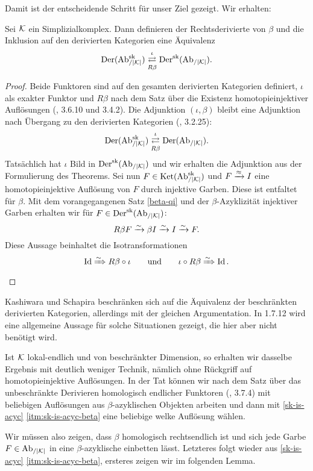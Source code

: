 Damit ist der entscheidende Schritt für unser Ziel gezeigt. Wir
erhalten:
\begin{theorem} \label{dersk-eq}
  Sei $\mathcal{K}$ ein Simplizialkomplex. Dann definieren der Rechtsderivierte
  von $\beta$ und die Inklusion auf den derivierten Kategorien eine
  Äquivalenz
  \[ \operatorname{Der}(\operatorname{Ab}_{/|\mathcal{K}|}^{\operatorname{sk}})
  \mathrel{\mathop{\rightleftarrows}^{\iota}_{R \beta}}
  \operatorname{Der}^{\operatorname{sk}}(\operatorname{Ab}_{/|\mathcal{K}|}). \]
\end{theorem}
\begin{proof}
  Beide Funktoren sind auf den gesamten derivierten Kategorien
  definiert, $\iota$ als exakter Funktor und $R\beta$ nach dem Satz
  über die Existenz homotopieinjektiver Auflösungen (\cite{TD}, 3.6.10
  und 3.4.2). Die Adjunktion $(\iota, \beta)$ bleibt eine Adjunktion
  nach Übergang zu den derivierten Kategorien (\cite{TD}, 3.2.25):
  \[ \operatorname{Der}(\operatorname{Ab}_{/|\mathcal{K}|}^{\operatorname{sk}})
  \mathrel{\mathop{\rightleftarrows}^{\iota}_{R \beta}}
  \operatorname{Der}(\operatorname{Ab}_{/|\mathcal{K}|}).
  \]
  Tatsächlich hat $\iota$ Bild in $\operatorname{Der}^{\operatorname{sk}}(\operatorname{Ab}_{/|\mathcal{K}|})$ und wir erhalten die
  Adjunktion aus der Formulierung des Theorems. Sei nun $F \in
  \operatorname{Ket}(\operatorname{Ab}_{/|\mathcal{K}|}^{\operatorname{sk}})$ und $F \xrightarrow{\approx} I$ eine homotopieinjektive Auflösung von
  $F$ durch injektive Garben. Diese ist entfaltet für $\beta$. Mit dem
  vorangegangenen Satz \ref{beta-qi} und der $\beta$-Azyklizität
  injektiver Garben erhalten wir für $F \in \operatorname{Der}^{\operatorname{sk}}(\operatorname{Ab}_{/|\mathcal{K}|})$:
  \[R \beta F \xrightarrow[]{\sim} \beta I \xrightarrow[]{\sim} I \xrightarrow[]{\sim} F. \]
  Diese Aussage beinhaltet die Isotransformationen
  \[ \operatorname{Id} \xRightarrow{\sim} R \beta \circ \iota
  \qquad \text{und} \qquad
  \iota \circ R \beta \xRightarrow{\sim} \operatorname{Id} .
  \]
\end{proof}
\begin{bem}
  Kashiwara und Schapira beschränken sich auf die Äquivalenz der
  beschränkten derivierten Kategorien, allerdings mit der gleichen
  Argumentation. In \cite{KS} 1.7.12 wird eine allgemeine Aussage für
  solche Situationen gezeigt, die hier aber nicht benötigt wird.
\end{bem}
\begin{bem} \label{dersk-eq-bounded-dim}
  Ist $\mathcal{K}$ lokal-endlich und von beschränkter Dimension, so erhalten
  wir dasselbe Ergebnis mit deutlich weniger Technik, nämlich ohne
  Rückgriff auf homotopieinjektive Auflösungen. In der Tat können wir
  nach dem Satz über das unbeschränkte Derivieren homologisch
  endlicher Funktoren (\cite{TG}, 3.7.4) mit beliebigen Auflösungen
  aus $\beta$-azyklischen Objekten arbeiten und dann mit
  \ref{sk-is-acyc} \ref{itm:sk-is-acyc-beta} eine beliebige welke
  Auflösung wählen.

  Wir müssen also zeigen, dass $\beta$ homologisch rechtsendlich ist
  und sich jede Garbe $F \in \operatorname{Ab}_{/|\mathcal{K}|}$ in eine $\beta$-azyklische
  einbetten lässt. Letzteres folgt wieder aus \ref{sk-is-acyc}
  \ref{itm:sk-is-acyc-beta}, ersteres zeigen wir im folgenden Lemma.
\end{bem}

